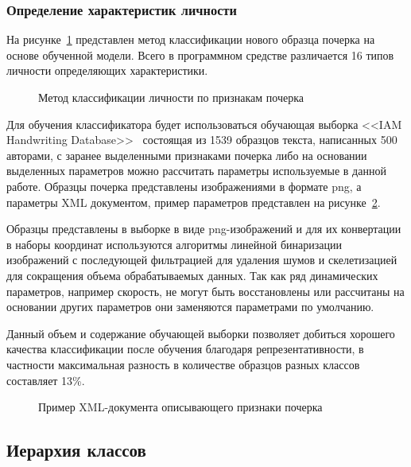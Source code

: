 \subsubsection{Определение характеристик личности}
На рисунке~\ref{listing:development:classification} представлен метод классификации нового образца почерка на основе обученной модели. Всего в программном средстве различается 16 типов личности определяющих характеристики.
\begin{figure}[ht]
    \centering
    
    \caption{Метод классификации личности по признакам почерка}
    \label{listing:development:classification}
\end{figure}

Для обучения классификатора будет использоваться обучающая выборка <<IAM Handwriting Database>>~\cite{IAM_handwriting_database} состоящая из 1539 образцов текста, написанных 500 авторами, с заранее выделенными признаками почерка либо на основании выделенных параметров можно рассчитать параметры используемые в данной работе. Образцы почерка представлены изображениями в формате png, а параметры XML документом, пример параметров представлен на рисунке~\ref{listing:development:sample_set}.

Образцы представлены в выборке в виде png-изображений и для их конвертации в наборы координат используются алгоритмы линейной бинаризации изображений с последующей фильтрацией для удаления шумов и скелетизацией для сокращения объема обрабатываемых данных. Так как ряд динамических параметров, например скорость, не могут быть восстановлены или рассчитаны на основании других параметров они заменяются параметрами по умолчанию. 

Данный объем и содержание обучающей выборки позволяет добиться хорошего качества классификации после обучения благодаря репрезентативности, в частности максимальная разность в количестве образцов разных классов составляет 13\%.

\begin{figure}[ht]
    \centering
    
    \caption{Пример XML-документа описывающего признаки почерка}
    \label{listing:development:sample_set}
\end{figure}

\subsection{Иерархия классов}

